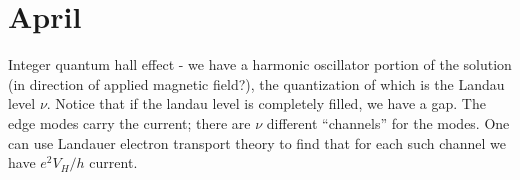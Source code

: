 \documentclass{report}
\begin{document}
\chapter{April}
\begin{tocbox}
	\minitoc
\end{tocbox}


\entry{}{}
Integer quantum hall effect - we have a harmonic oscillator portion of the 
solution (in direction of applied magnetic field?), the quantization of which 
is the Landau level $ \nu $. Notice that if the landau level is completely filled, 
we have a gap. The edge modes carry the current; there are $ \nu $ different 
``channels'' for the modes. One can use Landauer electron transport theory to 
find that for each such channel we have $ e^2 V_H/h $ current.
\end{document}
